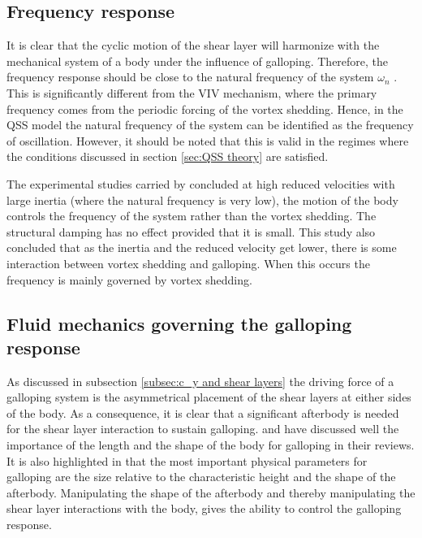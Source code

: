 \subsection{Frequency response}
 
 It is clear that the cyclic motion of the shear layer will harmonize with the mechanical system of a body under the influence of galloping. Therefore, the frequency response should be close to the natural frequency of the system $\omega_{n}$ \citep{Paidoussis2010}. This is significantly different from the VIV mechanism, where the primary frequency comes from the periodic forcing of the vortex shedding. Hence, in the QSS model the natural frequency of the system can be identified as the frequency of oscillation. However, it should be  noted that this is valid in the regimes where the conditions discussed in section \ref{sec:QSS theory} are satisfied. 
 
 The experimental studies carried by \citet{bouclin:77} concluded at high reduced velocities with large inertia (where the natural frequency is very low), the motion of the body controls the frequency of the system rather than the vortex shedding. The structural damping has no effect provided that it is small. This study also concluded that as the inertia and the reduced velocity get lower, there is some interaction between vortex shedding and galloping. When this occurs the frequency is mainly governed by vortex shedding. 
 
\subsection{Fluid mechanics governing the galloping response}
\label{subsec:fluid_mechanics_of_galloping}
 
 As discussed in subsection \ref{subsec:c_y and shear layers} the driving force of a galloping system is the asymmetrical placement of the shear layers at either sides of the body. As a consequence, it is clear that a significant afterbody is needed for the shear layer interaction to sustain galloping. \citet{Parkinson1974,Parkinson1989} and \citet{Bearman1987} have discussed well the importance of the length and the shape of the body for galloping in their reviews. It is also highlighted in \citet{Parkinson1974} that the most important physical parameters for galloping are the size relative to the characteristic height and the shape of the afterbody. Manipulating the shape of the afterbody and thereby manipulating the shear layer interactions with the body, gives the ability to control the galloping response.
 
